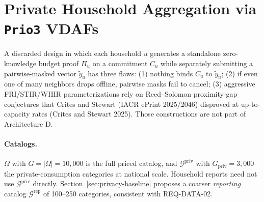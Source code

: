 \documentclass[10pt,twoside,openany]{book}
\theoremstyle{dpepstyle}
\begin{document}
\section{Private Household Aggregation via \texttt{Prio3} VDAFs}
\label{sec:prio3}

A discarded design in which each household $u$ generates a standalone zero-knowledge budget proof $\Pi_u$ on a commitment $C_u$ while separately submitting a pairwise-masked vector $\tilde{y}_u$ has three flaws: (1) nothing binds $C_u$ to $\tilde{y}_u$; (2) if even one of many neighbors drops offline, pairwise masks fail to cancel; (3) aggressive FRI/STIR/WHIR parameterizations rely on Reed--Solomon proximity-gap conjectures that Crites and Stewart (IACR ePrint 2025/2046) disproved at up-to-capacity rates (Crites and Stewart 2025). Those constructions are not part of Architecture D.

\paragraph{Catalogs.}
$\Omega$ with $G = |\Omega| = 10{,}000$ is the full priced catalog, and $\mathcal{G}^{\text{priv}}$ with $G_{\text{priv}} = 3{,}000$ the private-consumption categories at national scale. Household reports need not use $\mathcal{G}^{\text{priv}}$ directly. Section~\ref{sec:privacy-baseline} proposes a coarser \emph{reporting} catalog $\mathcal{G}^{\text{rep}}$ of 100--250 categories, consistent with REQ-DATA-02.
\end{document}
